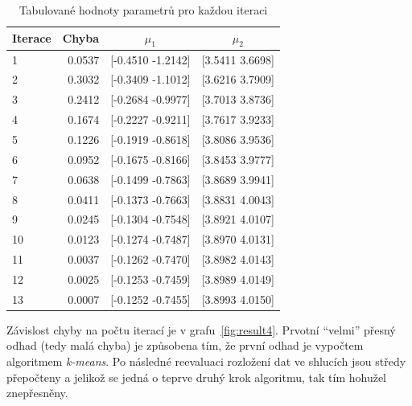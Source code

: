 \begin{table}[htb]
    \centering

    \begin{tabular}{lrcc}
        \toprule

        Iterace & Chyba     & \( \mu_1 \)       & \( \mu_2 \)       \\ \midrule
        1       & 0.0537    & [-0.4510 -1.2142] & [3.5411 3.6698]   \\
        2       & 0.3032    & [-0.3409 -1.1012] & [3.6216 3.7909]   \\
        3       & 0.2412    & [-0.2684 -0.9977] & [3.7013 3.8736]   \\
        4       & 0.1674    & [-0.2227 -0.9211] & [3.7617 3.9233]   \\
        5       & 0.1226    & [-0.1919 -0.8618] & [3.8086 3.9536]   \\
        6       & 0.0952    & [-0.1675 -0.8166] & [3.8453 3.9777]   \\
        7       & 0.0638    & [-0.1499 -0.7863] & [3.8689 3.9941]   \\
        8       & 0.0411    & [-0.1373 -0.7663] & [3.8831 4.0043]   \\
        9       & 0.0245    & [-0.1304 -0.7548] & [3.8921 4.0107]   \\
        10      & 0.0123    & [-0.1274 -0.7487] & [3.8970 4.0131]   \\
        11      & 0.0037    & [-0.1262 -0.7470] & [3.8982 4.0143]   \\
        12      & 0.0025    & [-0.1253 -0.7459] & [3.8989 4.0149]   \\
        13      & 0.0007    & [-0.1252 -0.7455] & [3.8993 4.0150]   \\
          
        \bottomrule
    \end{tabular}

    \caption{Tabulované hodnoty parametrů pro každou iteraci}
    \label{table:table1}
\end{table}
\FloatBarrier

Závislost chyby na počtu iterací je v grafu~\ref{fig:result4}.
Prvotní \enquote{velmi} přesný odhad (tedy malá chyba) je způsobena tím, že první odhad je vypočtem algoritmem \textit{k-means}.
Po následné reevaluaci rozložení dat ve shlucích jsou středy přepočteny a jelikož se jedná o teprve druhý krok algoritmu, tak tím hohužel znepřesněny.

